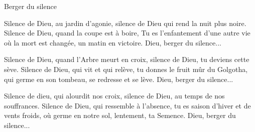 Berger du silence

Silence de Dieu, au jardin d’agonie, silence de Dieu qui rend la nuit plus noire.
Silence de Dieu, quand la coupe est à boire, Tu es l’enfantement d’une autre vie où la mort est changée, un matin en victoire.
Dieu, berger du silence...

\smallskip
Silence de Dieu, quand l’Arbre meurt en croix, silence de Dieu, tu deviens
cette sève. Silence de Dieu, qui vit et qui relève, tu donnes le fruit mûr du
Golgotha, qui germe en son tombeau, se redresse et se lève.
Dieu, berger du silence...

\smallskip
Silence de dieu, qui alourdit nos croix, silence de Dieu, au temps de nos
souffrances. Silence de Dieu, qui ressemble à l’absence, tu es saison d’hiver et
de vents froids, où germe en notre sol, lentement, ta Semence.
Dieu, berger du silence...


